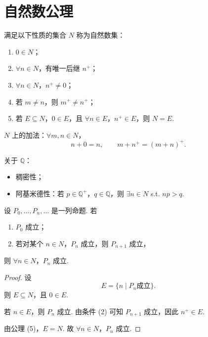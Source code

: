 \section{自然数公理}

满足以下性质的集合 $N$ 称为自然数集：
\begin{enumerate}
    \item $0 \in N$；
    \item $\forall n \in N$，有唯一后继 $n^+$；
    \item $\forall n \in N$，$n^+ \ne 0$；
    \item 若 $m \ne n$，则 $m^+ \ne n^+$；
    \item 若 $E \subseteq N$，$0 \in E$，且 $\forall n \in E$，$n^+ \in E$，则 $N = E$. 
\end{enumerate}

$N$ 上的加法：$\forall m,n \in N$，
\[
n + 0 = n,\qquad m + n^+ = (m+n)^+.
\]

关于 $\mathbb{Q}$：
\begin{itemize}
    \item 稠密性；
    \item 阿基米德性：若 $p \in \mathbb{Q}^+$，$q \in \mathbb{Q}$，则 $\exists n \in N$ s.t. $np > q$. 
\end{itemize}

\begin{theorem}[数学归纳法]
设 $P_0,\dots,P_n,\dots$ 是一列命题. 若
\begin{enumerate}
    \item $P_0$ 成立；
    \item 若对某个 $n \in N$，$P_n$ 成立，则 $P_{n+1}$ 成立，
\end{enumerate}
则 $\forall n \in N$，$P_n$ 成立. 
\end{theorem}

\begin{proof}
设
\[
E=\{n \mid P_n \text{成立}\}.
\]
则 $E \subseteq N$，且 $0 \in E$. 

若 $n \in E$，则 $P_n$ 成立. 由条件 (2) 可知 $P_{n+1}$ 成立，因此 $n^+ \in E$. 

由公理 (5)，$E=N$. 故 $\forall n \in N$，$P_n$ 成立. 
\end{proof}
